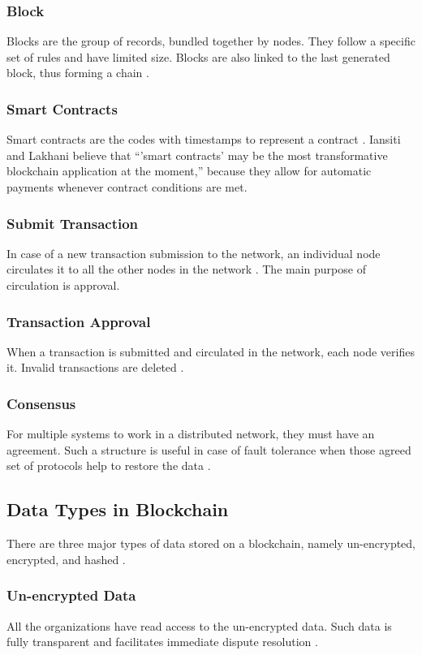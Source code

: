 \documentclass[sigconf]{acmart}
\begin{document}
\subsubsection{Block} Blocks are the group of records, bundled together by nodes. They follow a specific set of rules and have limited size. Blocks are also linked to the last generated block, thus forming a chain \cite{pabc1}.

\subsubsection{Smart Contracts} Smart contracts are the codes with timestamps to represent a contract \cite{pabc1}. Iansiti and Lakhani \cite{hbr} believe that ``'smart contracts' may be the most transformative blockchain application at the moment,'' because they allow for automatic payments whenever contract conditions are met. 

\subsubsection{Submit Transaction} In case of a new transaction submission to the network, an individual node circulates it to all the other nodes in the network \cite{pabc1}. The main purpose of circulation is approval. 

\subsubsection{Transaction Approval} When a transaction is submitted and circulated in the network, each node verifies it. Invalid transactions are deleted \cite{pabc1}.

\subsubsection{Consensus} For multiple systems to work in a distributed network, they must have an agreement. Such a structure is useful in case of fault tolerance when those agreed set of protocols help to restore the data \cite{pabc1}.

\subsection{Data Types in Blockchain}
There are three major types of data stored on a blockchain, namely un-encrypted, encrypted, and hashed \cite{arbc1}. 

\subsubsection{Un-encrypted Data} All the organizations have read access to the un-encrypted data. Such data is fully transparent and facilitates immediate dispute resolution \cite{arbc1}.
\end{document}
